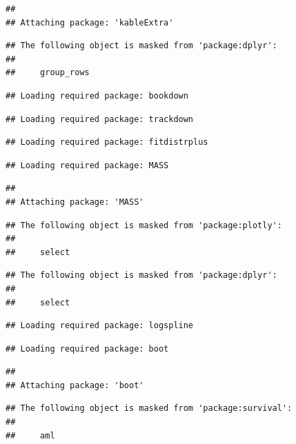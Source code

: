 \documentclass[
]{book}
\begin{document}
\begin{verbatim}
## 
## Attaching package: 'kableExtra'
\end{verbatim}

\begin{verbatim}
## The following object is masked from 'package:dplyr':
## 
##     group_rows
\end{verbatim}

\begin{verbatim}
## Loading required package: bookdown
\end{verbatim}

\begin{verbatim}
## Loading required package: trackdown
\end{verbatim}

\begin{verbatim}
## Loading required package: fitdistrplus
\end{verbatim}

\begin{verbatim}
## Loading required package: MASS
\end{verbatim}

\begin{verbatim}
## 
## Attaching package: 'MASS'
\end{verbatim}

\begin{verbatim}
## The following object is masked from 'package:plotly':
## 
##     select
\end{verbatim}

\begin{verbatim}
## The following object is masked from 'package:dplyr':
## 
##     select
\end{verbatim}

\begin{verbatim}
## Loading required package: logspline
\end{verbatim}

\begin{verbatim}
## Loading required package: boot
\end{verbatim}

\begin{verbatim}
## 
## Attaching package: 'boot'
\end{verbatim}

\begin{verbatim}
## The following object is masked from 'package:survival':
## 
##     aml
\end{verbatim}
\end{document}
